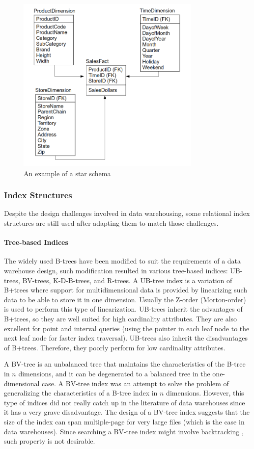 \documentclass[12pt,a4paper]{article}
\begin{document}
\begin{figure}[!t]
\centering
\includegraphics[width=9cm]{figs/starschema.png}
\caption{An example of a star schema}
\label{fig:starschema}
\end{figure}

\subsubsection{Index Structures}
Despite the design challenges involved in data warehousing, some relational index structures are still used after adapting them to match those challenges. 

\paragraph{Tree-based Indices}
The widely used B-trees have been modified to suit the requirements of a data warehouse design, such modification resulted in various tree-based indices:
UB-trees, BV-trees, K-D-B-trees, and R-trees. A UB-tree index \cite{bayer1997universal} is a variation of B+trees where support for multidimensional data is
provided by linearizing such data to be able to store it in one dimension. Usually the Z-order (Morton-order) \cite{morton1966computer} is used to perform this
type of linearization. UB-trees inherit the advantages of B+trees, so they are well suited for high cardinality attributes. They are also excellent for point
and interval queries (using the pointer in each leaf node to the next leaf node for faster index traversal). UB-trees also inherit the disadvantages of
B+trees. Therefore, they poorly perform for low cardinality attributes.

A BV-tree \cite{freeston1995general} is an unbalanced tree that maintains the characteristics of the B-tree in $n$ dimensions, and it can be degenerated to a
balanced tree in the one-dimensional case. A BV-tree index was an attempt to solve the problem of generalizing the characteristics of a B-tree index in $n$
dimensions. However, this type of indices did not really catch up in the literature of data warehouses since it has a very grave disadvantage. The
design of a BV-tree index suggests that the size of the index can span multiple-page for very large files (which is the case in data warehouses). Since
searching a BV-tree index might involve backtracking \cite{freeston1995general}, such property is not desirable.
\end{document}
